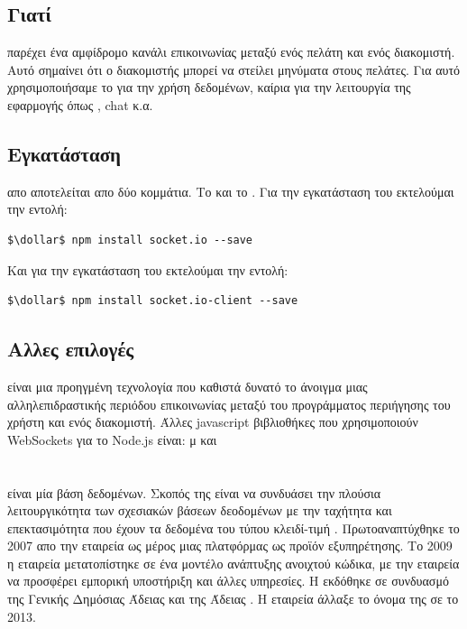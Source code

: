 \subsection*{Γιατί}
  παρέχει ένα αμφίδρομο κανάλι επικοινωνίας μεταξύ ενός πελάτη και ενός διακομιστή. Αυτό σημαίνει ότι ο διακομιστής μπορεί να στείλει μηνύματα στους πελάτες. Για αυτό χρησιμοποιήσαμε το  για την χρήση  δεδομένων, καίρια για την λειτουργία της εφαρμογής όπως , chat κ.α. 

\subsection*{Εγκατάσταση}
  απο αποτελείται απο δύο κομμάτια. Το  και το . Για την εγκατάσταση του  εκτελούμαι την εντολή:
    \begin{lstlisting}[language=command.com]
    $\dollar$ npm install socket.io --save
    \end{lstlisting}
Και για την εγκατάσταση του  εκτελούμαι την εντολή:
    \begin{lstlisting}[language=command.com]
    $\dollar$ npm install socket.io-client --save
    \end{lstlisting}

\subsection*{Αλλες επιλογές}
  είναι μια προηγμένη τεχνολογία που καθιστά δυνατό το άνοιγμα μιας αλληλεπιδραστικής περιόδου επικοινωνίας μεταξύ του προγράμματος περιήγησης του χρήστη και ενός διακομιστή. Άλλες javascript βιβλιοθήκες που χρησιμοποιούν WebSockets για το Node.js είναι: μ και 

\section{}
  είναι μία  βάση δεδομένων. Σκοπός της είναι να συνδυάσει την πλούσια λειτουργικότητα των σχεσιακών βάσεων δεοδομένων με την ταχήτητα και επεκτασιμότητα που έχουν τα δεδομένα του τύπου κλειδί-τιμή . Πρωτοαναπτύχθηκε το 2007 απο την εταιρεία  ως μέρος μιας πλατφόρμας ως προϊόν εξυπηρέτησης. Το 2009 η εταιρεία μετατοπίστηκε σε ένα μοντέλο ανάπτυξης ανοιχτού κώδικα, με την εταιρεία να προσφέρει εμπορική υποστήριξη και άλλες υπηρεσίες. Η  εκδόθηκε σε συνδυασμό της Γενικής Δημόσιας Άδειας  και της Άδειας . Η εταιρεία  άλλαξε το όνομα της σε  το 2013. 

